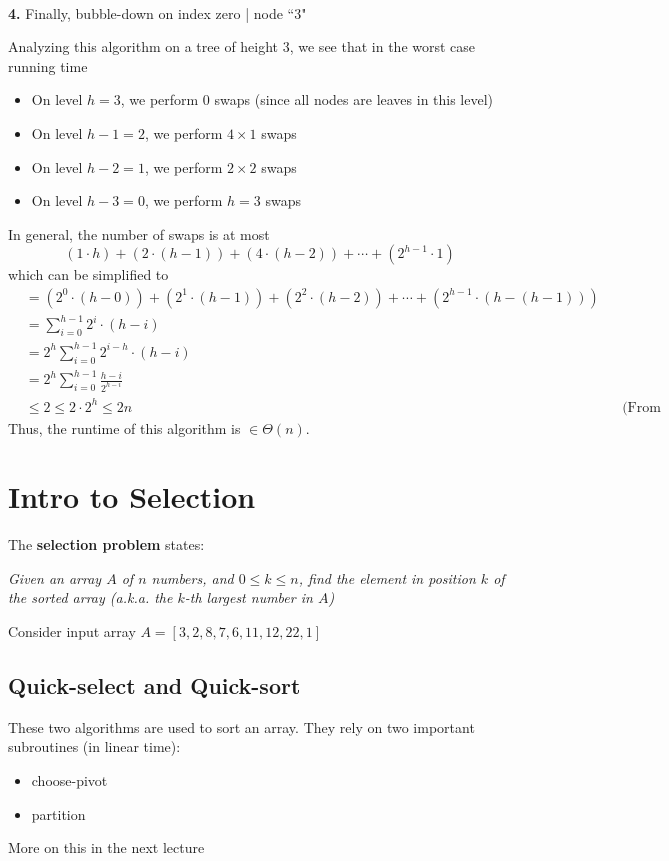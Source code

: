 \documentclass{report}
\begin{document}
\begin{center}
\\ \textbf{4.} Finally, bubble-down on index zero | node ``3" \\
\end{center}
Analyzing this algorithm on a tree of height 3, we see that in the worst case running time
\begin{itemize}
\item On level $h=3$, we perform 0 swaps (since all nodes are leaves in this level)
\item On level $h-1 = 2$, we perform $4 \times 1$ swaps
\item On level $h-2 = 1$, we perform $2 \times 2$ swaps
\item On level $h-3 = 0$, we perform $h=3$ swaps
\end{itemize}
In general, the number of swaps is at most
$$(1 \cdot h) + (2 \cdot (h-1)) + (4 \cdot (h-2)) + \cdots + (2^{h-1} \cdot 1)$$
which can be simplified to
\begin{align*}
&= (2^0 \cdot (h-0)) + (2^1 \cdot (h-1)) + (2^2 \cdot (h-2)) + \cdots + (2^{h-1} \cdot (h - (h-1))) \\
&= \sum_{i=0}^{h-1} 2^i \cdot (h-i) \\
&= 2^h \sum_{i=0}^{h-1} 2^{i-h} \cdot (h-i) \\
&= 2^h \sum_{i=0}^{h-1} \frac{h-i}{2^{h-i}}\\
&\leq 2 \leq 2 \cdot 2^h \leq 2n && \text{(From equation 5.4)}
\end{align*}
Thus, the runtime of this algorithm is $\in \Theta(n)$.
\section{Intro to Selection}
The \textbf{selection problem} states:
\begin{center}
\textit{Given an array $A$ of $n$ numbers, and $0 \leq k \leq n$, find the element in position $k$ of the sorted array (a.k.a. the $k$-th largest number in $A$)}
\end{center}
Consider input array $A = [3,2,8,7,6,11,12,22,1]$
\subsection{Quick-select and Quick-sort}
These two algorithms are used to sort an array. They rely on two important subroutines (in linear time):
\begin{itemize}
\item choose-pivot
\item partition
\end{itemize}
More on this in the next lecture
\end{document}
